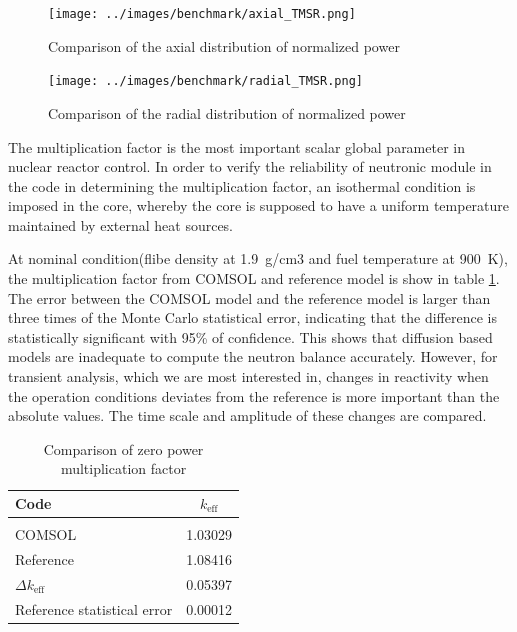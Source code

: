\documentclass{elsarticle}
\newcommand{\keff}{{\ensuremath{k_{\mathrm{eff}}}} }
\begin{document}
\begin{figure}[ht]
  \centering
  \texttt{[image: ../images/benchmark/axial\_TMSR.png]}
  \caption{Comparison of the axial distribution of normalized power}
  \label{fig:axial_power}
\end{figure}

\begin{figure}[ht]
  \centering
  \texttt{[image: ../images/benchmark/radial\_TMSR.png]}
  \caption{Comparison of the radial distribution of normalized power}
  \label{fig:radial_power}
\end{figure}


The multiplication factor is the most important scalar global parameter in nuclear reactor control. In order to verify the reliability of neutronic module in the code in determining the multiplication factor, an isothermal condition is imposed in the core, whereby the core is supposed to have a uniform temperature maintained by external heat sources. 
 
At nominal condition(flibe density at 1.9~g/cm3 and fuel temperature at 900~K), the multiplication factor from COMSOL and reference model is show in table \ref{tab:keff}. The error between the COMSOL model and the reference model is larger than three times of the Monte Carlo statistical error, indicating that the difference is statistically significant with 95\% of confidence. This shows that diffusion based models are inadequate to compute the neutron balance accurately. However, for transient analysis, which we are most interested in, changes in reactivity when the operation conditions deviates from the reference is more important than the absolute values.
The time scale and amplitude of these changes are compared.

\begin{table}
\centering
  \begin{tabular}{lc}
  \hline
        Code & \keff \\
        \hline\\
       COMSOL & 1.03029  \\
       Reference & 1.08416\\
       $\Delta$\keff & 0.05397\\
       Reference statistical error & 0.00012\\
       \hline
  \end{tabular}
  \caption{Comparison of zero power multiplication factor}
  \label{tab:keff}
\end{table}
\end{document}
